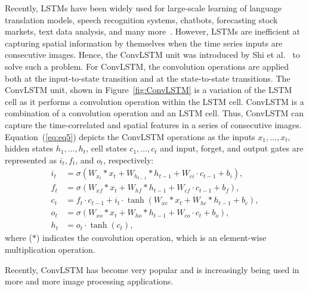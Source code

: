 Recently, LSTMs have been widely used for large-scale learning of language translation models, speech recognition systems, chatbots, forecasting stock markets, text data analysis, and many more~\cite{graves2014towards, cho2014properties}. 
However, LSTMs are inefficient at capturing spatial information by themselves when the time series inputs are consecutive images.
Hence, the ConvLSTM unit was introduced by Shi et al.~\cite{xingjian2015convolutional} to solve such a problem.
For ConvLSTM, the convolution operations are applied both at the input-to-state transition and at the state-to-state transitions.  
The ConvLSTM unit, shown in Figure~\ref{fig:ConvLSTM} is a variation of the 
LSTM cell as it performs a convolution operation within the LSTM cell.
ConvLSTM is a combination of a convolution operation and an LSTM cell.
Thus, ConvLSTM can capture the time-correlated and spatial features in a series of consecutive images.
Equation~(\ref{eq:eq5}) depicts the ConvLSTM operations as the inputs \(x_1, \dots, x_t\), hidden states \(h_1, \dots, h_t\), cell states \(c_1, \dots, c_t\) and input, forget, and output gates are represented as \(i_t, f_t\), and \(o_t\), respectively:
\begin{equation}
	\begin{aligned}
		i_{t} &=\sigma\left(W_{x_t} * x_{t}+W_{h_{t-1}} * h_{t-1}+W_{c i} \cdot c_{t-1}+b_{i}\right),
		\\
		f_{t} &=\sigma\left(W_{x f} * x_{t}+W_{h f} * h_{t-1}+W_{c f} \cdot c_{t-1}+b_{f}\right), \\
		c_{t} &=f_{t} \cdot c_{t-1}+i_{t} \cdot \tanh \left(W_{x c} * x_{t}+W_{h c} * h_{t-1}+b_{c}\right), 
		\\
		o_{t} &=\sigma\left(W_{x o} * x_{t}+W_{h o} * h_{t-1}+W_{c o} \cdot c_{t}+b_{o}\right), \\
		h_{t} &=o_{t} \cdot \tanh \left(c_{t}\right),
	\end{aligned}
	\label{eq:eq5}
\end{equation}
where (\(*\)) indicates the convolution operation, which is an element-wise multiplication operation.

Recently, ConvLSTM has become very popular and is increasingly being used in 
more and more image processing applications.